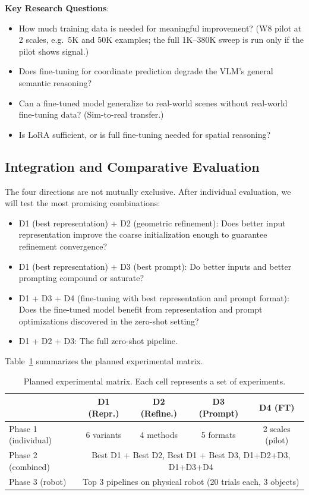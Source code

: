 \documentclass[11pt,a4paper]{article}
\begin{document}
\textbf{Key Research Questions}:
\begin{itemize}[nosep]
    \item How much training data is needed for meaningful improvement? (W8 pilot at 2 scales, e.g.\ 5K and 50K examples; the full 1K--380K sweep is run only if the pilot shows signal.)
    \item Does fine-tuning for coordinate prediction degrade the VLM's general semantic reasoning?
    \item Can a fine-tuned model generalize to real-world scenes without real-world fine-tuning data? (Sim-to-real transfer.)
    \item Is LoRA sufficient, or is full fine-tuning needed for spatial reasoning?
\end{itemize}

\subsection{Integration and Comparative Evaluation}

The four directions are not mutually exclusive. After individual evaluation, we will test the most promising combinations:

\begin{itemize}[nosep]
    \item D1 (best representation) + D2 (geometric refinement): Does better input representation improve the coarse initialization enough to guarantee refinement convergence?
    \item D1 (best representation) + D3 (best prompt): Do better inputs and better prompting compound or saturate?
    \item D1 + D3 + D4 (fine-tuning with best representation and prompt format): Does the fine-tuned model benefit from representation and prompt optimizations discovered in the zero-shot setting?
    \item D1 + D2 + D3: The full zero-shot pipeline.
\end{itemize}

Table~\ref{tab:experiments} summarizes the planned experimental matrix.

\begin{table}[H]
\centering
\caption{Planned experimental matrix. Each cell represents a set of experiments.}
\label{tab:experiments}
\begin{tabular}{@{}lcccc@{}}
\toprule
& \textbf{D1 (Repr.)} & \textbf{D2 (Refine.)} & \textbf{D3 (Prompt)} & \textbf{D4 (FT)} \\
\midrule
Phase 1 (individual) & 6 variants & 4 methods & 5 formats & 2 scales (pilot) \\
Phase 2 (combined) & \multicolumn{4}{c}{Best D1 + Best D2, Best D1 + Best D3, D1+D2+D3, D1+D3+D4} \\
Phase 3 (robot)  & \multicolumn{4}{c}{Top 3 pipelines on physical robot (20 trials each, 3 objects)} \\
\bottomrule
\end{tabular}
\end{table}
\end{document}
